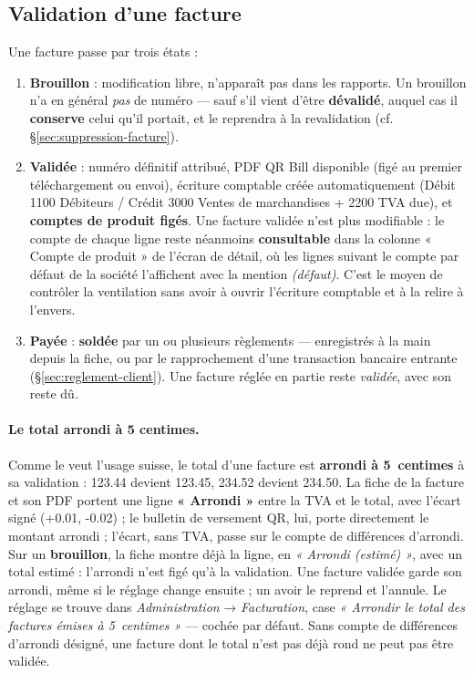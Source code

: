 \documentclass[a4paper,11pt,oneside]{article}
\begin{document}
\subsection{Validation d'une facture}

Une facture passe par trois états :

\begin{enumerate}
    \item \textbf{Brouillon} : modification libre, n'apparaît pas dans les rapports. Un brouillon n'a en général \emph{pas} de numéro --- sauf s'il vient d'être \textbf{dévalidé}, auquel cas il \textbf{conserve} celui qu'il portait, et le reprendra à la revalidation (cf. \S\ref{sec:suppression-facture}).
    \item \textbf{Validée} : numéro définitif attribué, PDF QR Bill disponible (figé au premier téléchargement ou envoi), écriture comptable créée automatiquement (Débit 1100 Débiteurs / Crédit 3000 Ventes de marchandises + 2200 TVA due), et \textbf{comptes de produit figés}. Une facture validée n'est plus modifiable : le compte de chaque ligne reste néanmoins \textbf{consultable} dans la colonne « Compte de produit » de l'écran de détail, où les lignes suivant le compte par défaut de la société l'affichent avec la mention \emph{(défaut)}. C'est le moyen de contrôler la ventilation sans avoir à ouvrir l'écriture comptable et à la relire à l'envers.
    \item \textbf{Payée} : \textbf{soldée} par un ou plusieurs règlements --- enregistrés à la main
          depuis la fiche, ou par le rapprochement d'une transaction bancaire entrante
          (\S\ref{sec:reglement-client}). Une facture réglée en partie reste \emph{validée}, avec
          son reste dû.
\end{enumerate}

\paragraph{Le total arrondi à 5 centimes.} Comme le veut l'usage suisse, le total d'une facture est \textbf{arrondi à 5~centimes} à sa validation : 123.44 devient 123.45, 234.52 devient 234.50. La fiche de la facture et son PDF portent une ligne \textbf{« Arrondi »} entre la TVA et le total, avec l'écart signé (+0.01, -0.02) ; le bulletin de versement QR, lui, porte directement le montant arrondi ; l'écart, sans TVA, passe sur le compte de différences d'arrondi. Sur un \textbf{brouillon}, la fiche montre déjà la ligne, en \emph{« Arrondi (estimé) »}, avec un total estimé : l'arrondi n'est figé qu'à la validation. Une facture validée garde son arrondi, même si le réglage change ensuite ; un avoir le reprend et l'annule. Le réglage se trouve dans \emph{Administration} → \emph{Facturation}, case \emph{« Arrondir le total des factures émises à 5~centimes »} --- cochée par défaut. Sans compte de différences d'arrondi désigné, une facture dont le total n'est pas déjà rond ne peut pas être validée.
\end{document}
